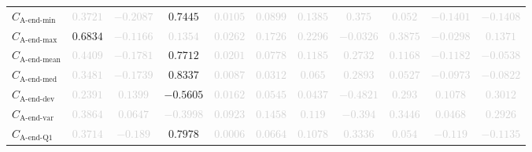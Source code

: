 \documentclass{standalone}
\newcommand{\lastminname}{\text{A-end-min}}
\newcommand{\lastmin}{C_{\lastminname}}
\newcommand{\lastmaxname}{\text{A-end-max}}
\newcommand{\lastmax}{C_{\lastmaxname}}
\newcommand{\lastmeanname}{\text{A-end-mean}}
\newcommand{\lastmean}{C_{\lastmeanname}}
\newcommand{\lastmedianname}{\text{A-end-med}}
\newcommand{\lastmedian}{C_{\lastmedianname}}
\newcommand{\lastdevname}{\text{A-end-dev}}
\newcommand{\lastdev}{C_{\lastdevname}}
\newcommand{\lastvarname}{\text{A-end-var}}
\newcommand{\lastvar}{C_{\lastvarname}}
\newcommand{\lastqonename}{\text{A-end-Q1}}
\newcommand{\lastqone}{C_{\lastqonename}}
\begin{document}
\begin{tabular}{lcccccccccc}
$\lastmin$ & \textcolor{lightgray}{$0.3721$} & \textcolor{lightgray}{$-0.2087$} & $0.7445$ & \textcolor{lightgray}{$0.0105$} & \textcolor{lightgray}{$0.0899$} & \textcolor{lightgray}{$0.1385$} & \textcolor{lightgray}{$0.375$} & \textcolor{lightgray}{$0.052$} & \textcolor{lightgray}{$-0.1401$} & \textcolor{lightgray}{$-0.1408$} \\ 
$\lastmax$ & $0.6834$ & \textcolor{lightgray}{$-0.1166$} & \textcolor{lightgray}{$0.1354$} & \textcolor{lightgray}{$0.0262$} & \textcolor{lightgray}{$0.1726$} & \textcolor{lightgray}{$0.2296$} & \textcolor{lightgray}{$-0.0326$} & \textcolor{lightgray}{$0.3875$} & \textcolor{lightgray}{$-0.0298$} & \textcolor{lightgray}{$0.1371$} \\ 
$\lastmean$ & \textcolor{lightgray}{$0.4409$} & \textcolor{lightgray}{$-0.1781$} & $0.7712$ & \textcolor{lightgray}{$0.0201$} & \textcolor{lightgray}{$0.0778$} & \textcolor{lightgray}{$0.1185$} & \textcolor{lightgray}{$0.2732$} & \textcolor{lightgray}{$0.1168$} & \textcolor{lightgray}{$-0.1182$} & \textcolor{lightgray}{$-0.0538$} \\ 
$\lastmedian$ & \textcolor{lightgray}{$0.3481$} & \textcolor{lightgray}{$-0.1739$} & $0.8337$ & \textcolor{lightgray}{$0.0087$} & \textcolor{lightgray}{$0.0312$} & \textcolor{lightgray}{$0.065$} & \textcolor{lightgray}{$0.2893$} & \textcolor{lightgray}{$0.0527$} & \textcolor{lightgray}{$-0.0973$} & \textcolor{lightgray}{$-0.0822$} \\ 
$\lastdev$ & \textcolor{lightgray}{$0.2391$} & \textcolor{lightgray}{$0.1399$} & $-0.5605$ & \textcolor{lightgray}{$0.0162$} & \textcolor{lightgray}{$0.0545$} & \textcolor{lightgray}{$0.0437$} & \textcolor{lightgray}{$-0.4821$} & \textcolor{lightgray}{$0.293$} & \textcolor{lightgray}{$0.1078$} & \textcolor{lightgray}{$0.3012$} \\ 
$\lastvar$ & \textcolor{lightgray}{$0.3864$} & \textcolor{lightgray}{$0.0647$} & \textcolor{lightgray}{$-0.3998$} & \textcolor{lightgray}{$0.0923$} & \textcolor{lightgray}{$0.1458$} & \textcolor{lightgray}{$0.119$} & \textcolor{lightgray}{$-0.394$} & \textcolor{lightgray}{$0.3446$} & \textcolor{lightgray}{$0.0468$} & \textcolor{lightgray}{$0.2926$} \\ 
$\lastqone$ & \textcolor{lightgray}{$0.3714$} & \textcolor{lightgray}{$-0.189$} & $0.7978$ & \textcolor{lightgray}{$0.0006$} & \textcolor{lightgray}{$0.0664$} & \textcolor{lightgray}{$0.1078$} & \textcolor{lightgray}{$0.3336$} & \textcolor{lightgray}{$0.054$} & \textcolor{lightgray}{$-0.119$} & \textcolor{lightgray}{$-0.1135$} \\ 

\end{tabular}
\end{document}
